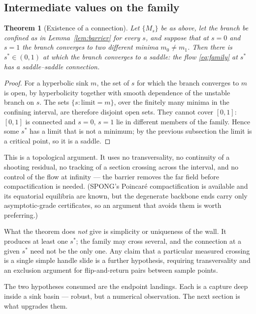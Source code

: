 \documentclass[11pt]{article}
\theoremstyle{plain}
\newtheorem{theorem}{Theorem}[section]
\theoremstyle{definition}
\theoremstyle{remark}
\begin{document}
\subsection*{Intermediate values on the family}

\begin{theorem}[Existence of a connection]\label{thm:existence}
Let $\{M_s\}$ be as above, let the branch be confined as in
Lemma~\ref{lem:barrier} for every $s$, and suppose that at $s = 0$ and $s = 1$
the branch converges to two \emph{different} minima $m_0 \neq m_1$. Then there
is $s^* \in (0,1)$ at which the branch converges to a saddle: the flow
\eqref{eq:family} at $s^*$ has a saddle--saddle connection.
\end{theorem}

\begin{proof}
For a hyperbolic sink $m$, the set of $s$ for which the branch converges to
$m$ is open, by hyperbolicity together with smooth dependence of the unstable
branch on $s$. The sets $\{s : \text{limit} = m\}$, over the finitely many
minima in the confining interval, are therefore disjoint open sets. They
cannot cover $[0,1]$: $[0,1]$ is connected and $s=0$, $s=1$ lie in different
members of the family. Hence some $s^*$ has a limit that is not a minimum; by
the previous subsection the limit is a critical point, so it is a saddle.
\end{proof}

This is a topological argument. It uses no transversality, no continuity of a
shooting residual, no tracking of a section crossing across the interval, and
no control of the flow at infinity --- the barrier removes the far field
before compactification is needed. (SPONG's Poincar\'e compactification is
available and its equatorial equilibria are known, but the degenerate
backbone ends carry only asymptotic-grade certificates, so an argument that
avoids them is worth preferring.)

What the theorem does \emph{not} give is simplicity or uniqueness of the wall.
It produces at least one $s^*$; the family may cross several, and the
connection at a given $s^*$ need not be the only one. Any claim that a
particular measured crossing is a single simple handle slide is a further
hypothesis, requiring transversality and an exclusion argument for
flip-and-return pairs between sample points.

The two hypotheses consumed are the endpoint landings. Each is a capture deep
inside a sink basin --- robust, but a numerical observation. The next section
is what upgrades them.
\end{document}
